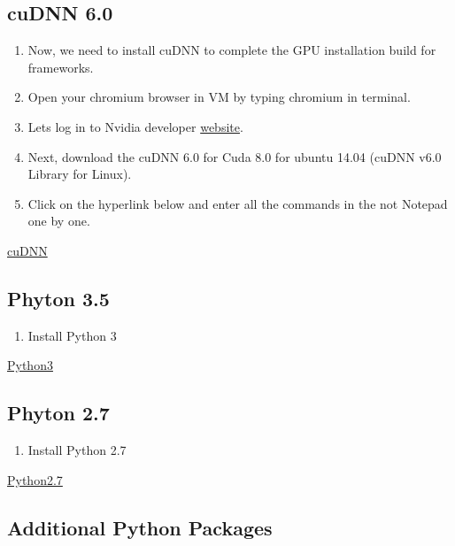 \documentclass[12pt]{article}
\begin{document}
\subsection{cuDNN 6.0}

\begin{enumerate}[resume]
  \item Now, we need to install cuDNN to complete the GPU installation build for frameworks.
  \item Open your chromium browser in VM by typing chromium in terminal.
  \item Lets log in to Nvidia developer  \href{https://developer.nvidia.com/rdp/cudnn-download}{website}.
  \item Next, download the cuDNN 6.0 for Cuda 8.0 for ubuntu 14.04 (cuDNN v6.0 Library for Linux).
  \item Click on the hyperlink below and enter all the commands in the not Notepad one by one.
\end{enumerate}

\begin{center}
\href{run:./Text_Files_16/cuDNN.txt}{\Large cuDNN}
\end{center}

\subsection{Phyton 3.5}

\begin{enumerate}[resume]
  \item Install Python 3
\end{enumerate}

\begin{center}
\href{run:./Text_Files_16/Python3.txt}{\Large Python3}
\end{center}

\subsection{Phyton 2.7}

\begin{enumerate}[resume]
  \item Install Python 2.7
\end{enumerate}

\begin{center}
\href{run:./Text_Files_16/Python2.txt}{\Large Python2.7}
\end{center}

\subsection{Additional Python Packages}
\end{document}
